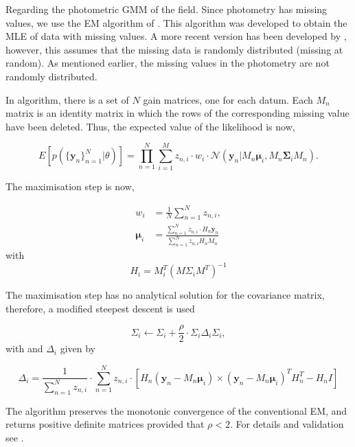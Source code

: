 Regarding the photometric GMM of the field. Since photometry has missing values, we use the EM algorithm of \citet{McMichael1996}. This algorithm was developed to obtain the MLE of data with missing values. A more recent version has been developed by \citet{Lin2006}, however, this assumes that the missing data is randomly distributed (missing at random). As mentioned earlier, the missing values in the photometry are not randomly distributed.

In \citet{McMichael1996} algorithm, there is a set of $N$ gain matrices, one for each datum. Each $M_n$ matrix is an identity matrix in which the rows of the corresponding missing value have been deleted. Thus, the expected value of the likelihood is now,

\begin{equation}
E[p(\{\mathbf{y}_n\}_{n=1}^N|\theta)]=\prod_{n=1}^N {\sum_{i=1} ^M {z_{n,i}\cdot w_i\cdot \mathcal{N}(\mathbf{y}_n|M_n \boldsymbol{\mu}_i,M_n\boldsymbol{\Sigma}_i M_n)}}.
\end{equation}

The maximisation step is now,

\begin{align}
w_i &= \frac{1}{N} \sum_{n=1}^N z_{n,i}, \\
\boldsymbol{\mu}_i &= \frac{ \sum_{n=1}^N z_{n,i}\cdot H_n \mathbf{y}_n}{\sum_{n=1}^N z_{n,i} H_n M_n}
\end{align}
with 
\begin{equation}
H_i=M_i^T(M\Sigma_i M^T)^{-1}
\end{equation}

The maximisation step has no analytical solution for the covariance matrix, therefore, a modified steepest descent is used

\begin{equation}
\Sigma_i \leftarrow \Sigma_i + \frac{\rho}{2}\cdot \Sigma_i\Delta_i\Sigma_i,
\end{equation}
with  and $\Delta_i$ given by

\begin{equation}
\Delta_i=  \frac{1}{\sum_{n=1}^N z_{n,i}}\cdot \sum_{n=1}^N z_{n,i} \cdot \left[H_n(\mathbf{y}_n -  M_n \boldsymbol{\mu}_i) \times  (\mathbf{y}_n -  M_n \boldsymbol{\mu}_i)^TH_n^T - H_nI\right]
\end{equation}
 
 The algorithm preserves the monotonic convergence of the conventional EM, and returns positive definite matrices provided that $\rho < 2$. For details and validation see \citet{McMichael1996}.

